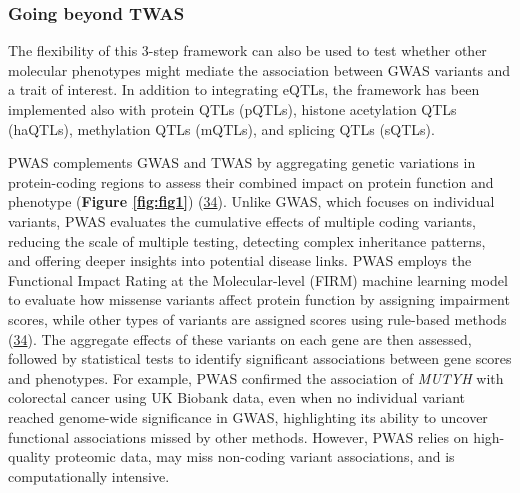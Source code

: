 \hypertarget{going-beyond-twas}{%
\subsubsection{Going beyond TWAS}\label{going-beyond-twas}}

The flexibility of this 3-step framework can also be used to test whether other molecular phenotypes might mediate the association between GWAS variants and a trait of interest.
In addition to integrating eQTLs, the framework has been implemented also with protein QTLs (pQTLs), histone acetylation QTLs (haQTLs), methylation QTLs (mQTLs), and splicing QTLs (sQTLs).

PWAS complements GWAS and TWAS by aggregating genetic variations in protein-coding regions to assess their combined impact on protein function and phenotype (\textbf{Figure \ref{fig:fig1}}) (\protect\hyperlink{ref-1Dsj6bEd3}{34}).
Unlike GWAS, which focuses on individual variants, PWAS evaluates the cumulative effects of multiple coding variants, reducing the scale of multiple testing, detecting complex inheritance patterns, and offering deeper insights into potential disease links.
PWAS employs the Functional Impact Rating at the Molecular-level (FIRM) machine learning model to evaluate how missense variants affect protein function by assigning impairment scores, while other types of variants are assigned scores using rule-based methods (\protect\hyperlink{ref-1Dsj6bEd3}{34}).
The aggregate effects of these variants on each gene are then assessed, followed by statistical tests to identify significant associations between gene scores and phenotypes.
For example, PWAS confirmed the association of \emph{MUTYH} with colorectal cancer using UK Biobank data, even when no individual variant reached genome-wide significance in GWAS, highlighting its ability to uncover functional associations missed by other methods.
However, PWAS relies on high-quality proteomic data, may miss non-coding variant associations, and is computationally intensive.

